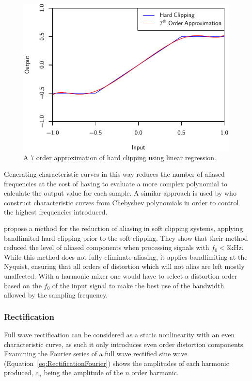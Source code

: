			\begin{figure}[h!]
				\centering
				\includegraphics{chapter5/Images/ClippingApproximation.pdf}
				\caption{A 7 order approximation of hard clipping using linear regression.}
				\label{fig:ClippingApproximation}
			\end{figure}

			Generating characteristic curves in this way reduces the number of aliased frequencies at the cost
			of having to evaluate a more complex polynomial to calculate the output value for each sample. A
			similar approach is used by \citet{fernandez-cid2001distortion} who construct characteristic curves
			from Chebyshev polynomials in order to control the highest frequencies introduced.

			\citet{esqueda2015aliasing} propose a method for the reduction of aliasing in soft clipping
			systems, applying bandlimited hard clipping prior to the soft clipping. They show that their method
			reduced the level of aliased components when processing signals with $f_{0} < 3$kHz. While this
			method does not fully eliminate aliasing, it applies bandlimiting at the Nyquist, ensuring that all
			orders of distortion which will not alias are left mostly unaffected. With a harmonic mixer one
			would have to select a distortion order based on the $f_{0}$ of the input signal to make the best
			use of the bandwidth allowed by the sampling frequency.

		\subsubsection*{Rectification}
			Full wave rectification can be considered as a static nonlinearity with an even characteristic
			curve, as such it only introduces even order distortion components. Examining the Fourier series of
			a full wave rectified sine wave (Equation~\ref{eq:RectificationFourier}) shows the amplitudes of
			each harmonic produced, $c_{n}$ being the amplitude of the $n$ order harmonic.

